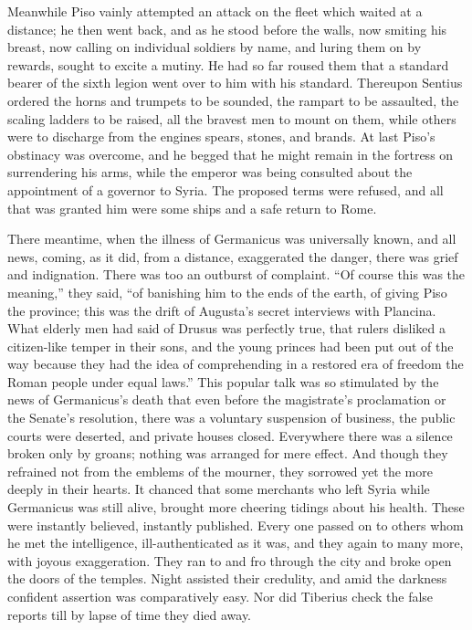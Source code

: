 
Meanwhile Piso vainly attempted an attack on the fleet which waited at a distance; he then went back, and as he stood before the walls, now smiting his breast, now calling on individual soldiers by name, and luring them on by rewards, sought to excite a mutiny. He had so far roused them that a standard bearer of the sixth legion went over to him with his standard. Thereupon Sentius ordered the horns and trumpets to be sounded, the rampart to be assaulted, the scaling ladders to be raised, all the bravest men to mount on them, while others were to discharge from the engines spears, stones, and brands. At last Piso's obstinacy was overcome, and he begged that he might remain in the fortress on surrendering his arms, while the emperor was being consulted about the appointment of a governor to Syria. The proposed terms were refused, and all that was granted him were some ships and a safe return to Rome.


There meantime, when the illness of Germanicus was universally known, and all news, coming, as it did, from a distance, exaggerated the danger, there was grief and indignation. There was too an outburst of complaint. ``Of course this was the meaning,'' they said, ``of banishing him to the ends of the earth, of giving Piso the province; this was the drift of Augusta's secret interviews with Plancina. What elderly men had said of Drusus was perfectly true, that rulers disliked a citizen-like temper in their sons, and the young princes had been put out of the way because they had the idea of comprehending in a restored era of freedom the Roman people under equal laws.'' This popular talk was so stimulated by the news of Germanicus's death that even before the magistrate's proclamation or the Senate's resolution, there was a voluntary suspension of business, the public courts were deserted, and private houses closed. Everywhere there was a silence broken only by groans; nothing was arranged for mere effect. And though they refrained not from the emblems of the mourner, they sorrowed yet the more deeply in their hearts. It chanced that some merchants who left Syria while Germanicus was still alive, brought more cheering tidings about his health. These were instantly believed, instantly published. Every one passed on to others whom he met the intelligence, ill-authenticated as it was, and they again to many more, with joyous exaggeration. They ran to and fro through the city and broke open the doors of the temples. Night assisted their credulity, and amid the darkness confident assertion was comparatively easy. Nor did Tiberius check the false reports till by lapse of time they died away.

